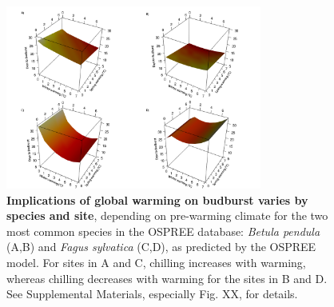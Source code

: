 \documentclass{article}
\begin{document}
\begin{figure}[h!]
\centering
\noindent \includegraphics[width=0.75\textwidth]{..//..//analyses/bb_analysis/figures/forecasting/tempforecastbothspp_1_7_degwarm_3D_utah.png}
\caption{\textbf{Implications of global warming on budburst varies by species and site}, depending on pre-warming climate for the two most common species in the OSPREE database: \emph{Betula pendula} (A,B) and \emph{Fagus sylvatica} (C,D), as predicted by the OSPREE model. For sites in A and C, chilling increases with warming, whereas chilling decreases with warming for the sites in B and D. See Supplemental Materials, especially Fig. XX, for details.}
\label{fig:fore}
\end{figure}

\end{document}
